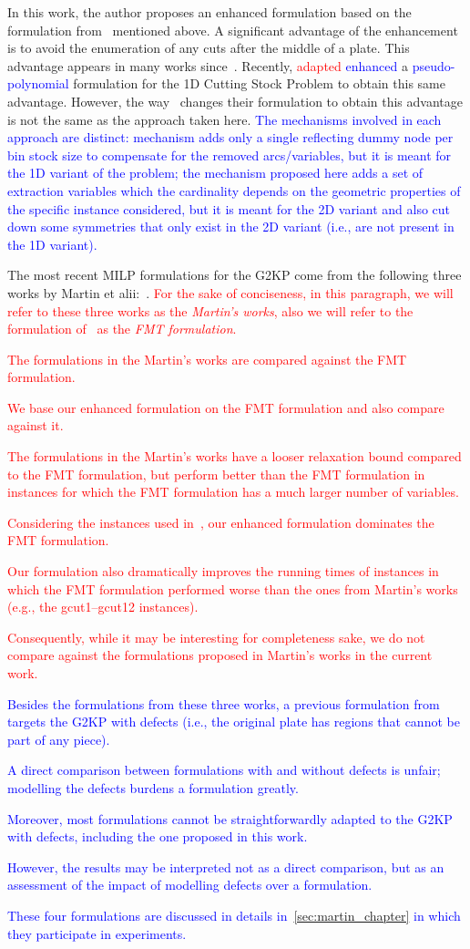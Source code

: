 \documentclass[ppgc,tese,english,formais,babel]{iiufrgs}
\newif\iffinalversion
\newcommand{\newtext}[1]{\iffinalversion%
#1%
\else%
\textcolor{blue}{#1}%
\fi%
}
\newcommand{\oldtext}[1]{\iffinalversion%
\else%
\textcolor{red}{#1}%
\fi%
}
\begin{document}
In this work, the author proposes an enhanced formulation based on the formulation from~\citet{furini:2016} mentioned above.
A significant advantage of the enhancement is to avoid the enumeration of any cuts after the middle of a plate.
This advantage appears in many works since~\citet{herz:1972}.
Recently, \citet{delorme:2019} \oldtext{adapted}\newtext{enhanced} a \newtext{pseudo-polynomial} formulation for the 1D Cutting Stock Problem to obtain this same advantage.
However, the way \citet{delorme:2019}~changes their formulation to obtain this advantage is not the same as the approach taken here.
\newtext{The mechanisms involved in each approach are distinct: \citet{delorme:2019} mechanism adds only a single reflecting dummy node per bin stock size to compensate for the removed arcs/variables, but it is meant for the 1D variant of the problem; the mechanism proposed here adds a set of extraction variables which the cardinality depends on the geometric properties of the specific instance considered, but it is meant for the 2D variant and also cut down some symmetries that only exist in the 2D variant (i.e., are not present in the 1D variant).}

The most recent MILP formulations for the G2KP come from the following three works by Martin et alii:~\citet{martin:2020:models,martin:2020:bottom,martin:2020:top}.
\oldtext{For the sake of conciseness, in this paragraph, we will refer to these three works as the \emph{Martin's works}, also we will refer to the formulation of~\citet{furini:2016} as the \emph{FMT formulation}.}
\oldtext{The formulations in the Martin's works are compared against the FMT formulation.}
\oldtext{We base our enhanced formulation on the FMT formulation and also compare against it.}
\oldtext{The formulations in the Martin's works have a looser relaxation bound compared to the FMT formulation, but perform better than the FMT formulation in instances for which the FMT formulation has a much larger number of variables.}
\oldtext{Considering the instances used in~\citet{furini:2016}, our enhanced formulation dominates the FMT formulation.}
\oldtext{Our formulation also dramatically improves the running times of instances in which the FMT formulation performed worse than the ones from Martin's works (e.g., the gcut1--gcut12 instances).}
\oldtext{Consequently, while it may be interesting for completeness sake, we do not compare against the formulations proposed in Martin's works in the current work.}
\newtext{Besides the formulations from these three works, a previous formulation from \citet{martin:2019} targets the G2KP with defects (i.e., the original plate has regions that cannot be part of any piece).}
\newtext{A direct comparison between formulations with and without defects is unfair; modelling the defects burdens a formulation greatly.}
\newtext{Moreover, most formulations cannot be straightforwardly adapted to the G2KP with defects, including the one proposed in this work.}
\newtext{However, the results may be interpreted not as a direct comparison, but as an assessment of the impact of modelling defects over a formulation.}
\newtext{These four formulations are discussed in details in~\cref{sec:martin_chapter} in which they participate in experiments.}
\end{document}
